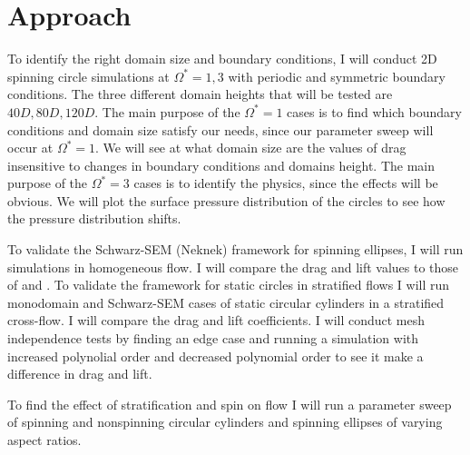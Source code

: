 \chapter{Approach}
\label{chp:Approach}
To identify the right domain size and boundary conditions, I will conduct 2D spinning circle simulations at $\Omega^{\ast} = 1, 3$ with periodic and symmetric boundary conditions. The three different domain heights that will be tested are $40D, 80D, 120D$. The main purpose of the $\Omega^{\ast}=1$ cases is to find which boundary conditions and domain size satisfy our needs, since our parameter sweep will occur at $\Omega^{\ast}=1$. We will see at what domain size are the values of drag insensitive to changes in boundary conditions and domains height. The main purpose of the $\Omega^{\ast}=3$ cases is to identify the physics, since the effects will be obvious. We will plot the surface pressure distribution of the circles to see how the pressure distribution shifts. 

To validate the Schwarz-SEM (Neknek) framework for spinning ellipses, I will run simulations in homogeneous flow. I will compare the drag and lift values to those of \cite{lu_flow_2018} and \cite{lua_rotating_2018}. To validate the framework for static circles in stratified flows I will run monodomain and Schwarz-SEM cases of static circular cylinders in a stratified cross-flow. I will compare the drag and lift coefficients. I will conduct mesh independence tests by finding an edge case and running a simulation with increased polynolial order and decreased polynomial order to see it make a difference in drag and lift. 

To find the effect of stratification and spin on flow I will run a parameter sweep of spinning and nonspinning circular cylinders and spinning ellipses of varying aspect ratios. 


